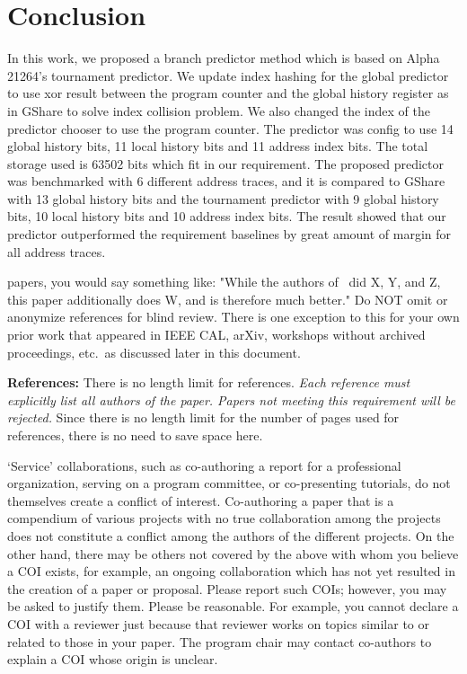 \documentclass[conference]{IEEEtran}
\begin{document}
\section{Conclusion}

In this work, we proposed a branch predictor method which is based on Alpha 21264's tournament predictor.
We update index hashing for the global predictor to use xor result between the program counter and the global
history register as in GShare to solve index collision problem. We also changed the index of the predictor chooser
to use the program counter. The predictor was config to use 14 global history bits,
11 local history bits and 11 address index bits. The total storage used is 63502 bits which fit in our requirement.
The proposed predictor was benchmarked with 6 different address traces, and it is compared to
GShare with 13 global history bits and the tournament predictor with 9 global history bits, 10 local history bits
and 10 address index bits. The result showed that our predictor outperformed the requirement baselines
by great amount of margin for all address traces.


papers\cite{nicepaper1,nicepaper2,nicepaper3}, you would say
something like: "While the authors of~\cite{nicepaper1,nicepaper2,nicepaper3} did X,
Y, and Z, this paper additionally does W, and is therefore much
better."  Do NOT omit or anonymize references for blind review.  There
is one exception to this for your own prior work that appeared in IEEE
CAL, arXiv, workshops without archived proceedings, etc.\ as
discussed later in this document. 

\noindent\textbf{References:}  There is no length limit for
references. {\em Each reference must explicitly list all authors of
  the paper.  Papers not meeting this requirement will be rejected.}
Since there is no length limit for the number of pages
used for references, there is no need to save space here. 


`Service' collaborations, such as co-authoring a report for a
professional organization, serving on a program committee, or
co-presenting tutorials, do not themselves create a conflict of
interest. Co-authoring a paper that is a compendium of various
projects with no true collaboration among the projects does not
constitute a conflict among the authors of the different projects. On
the other hand, there may be others not covered by the above with whom
you believe a COI exists, for example, an ongoing collaboration which
has not yet resulted in the creation of a paper or proposal. Please
report such COIs; however, you may be asked to justify them. Please be
reasonable. For example, you cannot declare a COI with a reviewer just
because that reviewer works on topics similar to or related to those
in your paper.  The program chair may contact co-authors to explain a COI
whose origin is unclear. 
\end{document}
